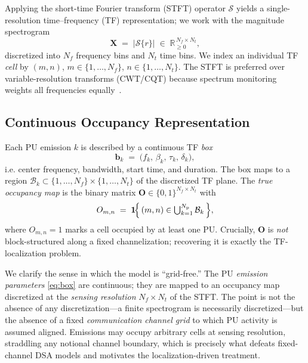 \documentclass[journal]{IEEEtran}
\newcommand{\R}{\mathbb{R}}
\newcommand{\Ind}{\mathbf{1}}             %
\newcommand{\rx}{r}                       %
\newcommand{\Npu}{N_{\mathrm{p}}}          %
\newcommand{\STFT}{\mathcal{S}}            %
\newcommand{\spec}{\bm{X}}                 %
\newcommand{\Nf}{N_f}                      %
\newcommand{\Nt}{N_t}                      %
\newcommand{\cell}{(m,n)}                  %
\newcommand{\boxk}{\bm{b}}                 %
\newcommand{\bfc}{f}                       %
\newcommand{\bBW}{\beta}                   %
\newcommand{\bts}{\tau}                    %
\newcommand{\bdur}{\delta}                 %
\newcommand{\occ}{O}                       %
\newcommand{\occmap}{\bm{O}}               %
\begin{document}
Applying the short-time Fourier transform (STFT) operator $\STFT$ yields a
single-resolution time--frequency (TF) representation; we work with the
magnitude spectrogram
\begin{equation}
\spec \;=\; \bigl|\STFT\{\rx\}\bigr| \;\in\; \R_{\ge 0}^{\,\Nf \times \Nt},
\label{eq:stft}
\end{equation}
discretized into $\Nf$ frequency bins and $\Nt$ time bins. We index an
individual TF \emph{cell} by $\cell$, $m\in\{1,\dots,\Nf\}$,
$n\in\{1,\dots,\Nt\}$. The STFT is preferred over variable-resolution
transforms (CWT/CQT) because spectrum monitoring weights all frequencies
equally~\cite{prasad2020}.

\subsection{Continuous Occupancy Representation}
\label{subsec:occupancy}
Each PU emission $k$ is described by a continuous TF \emph{box}
\begin{equation}
\boxk_k \;=\; \bigl(\bfc_k,\, \bBW_k,\, \bts_k,\, \bdur_k\bigr),
\label{eq:box}
\end{equation}
i.e. center frequency, bandwidth, start time, and duration. The box maps to
a region $\mathcal{B}_k \subset \{1,\dots,\Nf\}\times\{1,\dots,\Nt\}$ of the
discretized TF plane. The \emph{true occupancy map} is the binary matrix
$\occmap\in\{0,1\}^{\Nf\times\Nt}$ with
\begin{equation}
\occ_{m,n} \;=\;
\Ind\!\Bigl\{\, \cell \in \textstyle\bigcup_{k=1}^{\Npu}\mathcal{B}_k \,\Bigr\},
\label{eq:occupancy}
\end{equation}
where $\occ_{m,n}=1$ marks a cell occupied by at least one PU. Crucially,
$\occmap$ is \emph{not} block-structured along a fixed channelization;
recovering it is exactly the TF-localization problem.

We clarify the sense in which the model is ``grid-free.'' The PU
\emph{emission parameters} \eqref{eq:box} are continuous; they are mapped to
an occupancy map discretized at the \emph{sensing resolution} $\Nf\times\Nt$
of the STFT. The point is not the absence of any discretization---a finite
spectrogram is necessarily discretized---but the absence of a fixed
\emph{communication channel grid} to which PU activity is assumed aligned.
Emissions may occupy arbitrary cells at sensing resolution, straddling any
notional channel boundary, which is precisely what defeats fixed-channel DSA
models and motivates the localization-driven treatment.
\end{document}
